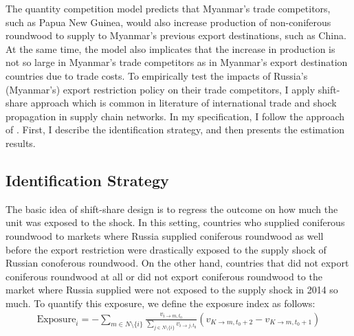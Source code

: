 \documentclass[a4paper,12pt]{article}
\begin{document}
The quantity competition model predicts that Myanmar's trade competitors, such as Papua New Guinea, would also increase production of non-coniferous roundwood to supply to Myanmar's previous export destinations, such as China. At the same time, the model also implicates that the increase in production is not so large in Myanmar's trade competitors as in Myanmar's export destination countries due to trade costs. To empirically test the impacts of Russia's (Myanmar's) export restriction policy on their trade competitors, I apply shift-share approach which is common in literature of international trade and shock propagation in supply chain networks. In my specification, I follow the approach of \cite{huneeus2018production}. First, I describe the identification strategy, and then presents the estimation results.

\subsection{Identification Strategy}
The basic idea of shift-share design is to regress the outcome on how much the unit was exposed to the shock. In this setting, countries who supplied coniferous roundwood to markets where Russia supplied coniferous roundwood as well before the export restriction were drastically exposed to the supply shock of Russian conoferous roundwood. On the other hand, countries that did not export coniferous roundwood at all or did not export coniferous roundwood to the market where Russia supplied were not exposed to the supply shock in 2014 so much. To quantify this exposure, we define the exposure index as follows:
\begin{align}
    \text{Exposure}_i =  - \sum_{m \in N \setminus \{ i \}} \frac{v_{i \to m, t_0}}{\sum_{j \in N \setminus \{ i \}} v_{i \to j, t_0}} (v_{K \to m, t_0+2} - v_{K \to m, t_0+1})
\end{align}
\end{document}
